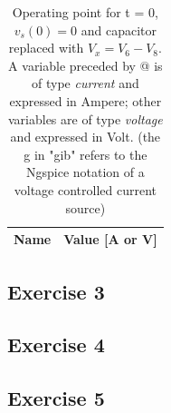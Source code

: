 \begin{table}[!ht]
  \centering
  \caption{Operating point for t = 0, $v_s(0) = 0$ and capacitor replaced with $V_x = V_6 - V_8$. A variable preceded by @ is of type {\em current}
    and expressed in Ampere; other variables are of type {\it voltage} and expressed in
    Volt. (the g in "gib" refers to the Ngspice notation of a voltage controlled current source)}
  \begin{tabular}{|l|r|}
    \hline    
    {\bf Name} & {\bf Value [A or V]} \\ \hline
    
  \end{tabular}
  \label{tab:op2}
\end{table}

\subsection{Exercise 3}
\label{Simulation Exercise 3}

\subsection{Exercise 4}
\label{Simulation Exercise 4}

\subsection{Exercise 5}
\label{Simulation Exercise 5}









